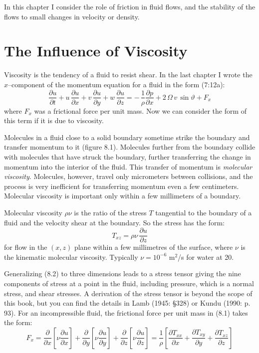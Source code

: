 In this chapter I consider the role of friction in fluid flows, and the stability
of the flows to small changes in velocity or density.

\section{The Influence of Viscosity}
Viscosity is the tendency of a fluid to resist shear. In the last chapter I wrote the $x$--component of the
momentum equation for a fluid in the form (7:12a):
\begin{equation}
\frac{\partial{u}}{\partial{t}}+u\,\frac{\partial{u}}{\partial{x}}+v\,
\frac{\partial{u}}{\partial{y}}+w\,\frac{\partial{u}}{\partial{z}}=-\,
\frac{1}{\rho}\frac{\partial{p}}{\partial{x}} + 2\,\Omega\,v\,\sin\vartheta + F_x
\end{equation}
where $F_x$ was a frictional force per unit mass. Now we can consider the form
of this term if it is due to viscosity.

Molecules in a fluid close to a solid boundary sometime strike the boundary and
transfer momentum to it (figure 8.1). Molecules further from the boundary
collide with molecules that have struck the boundary, further transferring the
change in momentum into the interior of the fluid. This transfer of momentum is
\textit{molecular viscosity}. Molecules, however, travel
only micrometers between collisions, and the process is very inefficient for
transferring momentum even a few centimeters. Molecular viscosity is important only
within a few millimeters of a boundary.

Molecular viscosity $\rho \nu$ is the ratio of the stress $T$ tangential to the
boundary of a fluid and the velocity shear at the boundary. So the
stress has the form:
\begin{equation}
T_{xz} =  \rho \nu \,\frac{\partial{u}}{\partial{z}}
\end{equation}
for flow in the $(x, z)$ plane within a few millimetres of the surface, where $\nu$
is the kinematic molecular viscosity. Typically $\nu = 10^{-6}$ m$^2$/s for water at
20.

Generalizing (8.2) to three dimensions leads to a stress tensor giving
the nine components of stress at a point in the fluid, including
pressure, which is a normal stress, and shear stresses. A derivation of the
stress tensor is beyond the scope of this book, but you can find the details in
Lamb (1945: \S 328) or Kundu (1990: p. 93). For an incompressible fluid, the
frictional force per unit mass in (8.1) takes the form:
\begin{equation}
F_x= \frac{\partial }{\partial x} \left[ \nu \frac{\partial u}{\partial x} \right]
   + \frac{\partial }{\partial y} \left[ \nu \frac{\partial u}{\partial y} \right]
   + \frac{\partial }{\partial z} \left[ \nu \frac{\partial u}{\partial z} \right]
= \frac{1}{\rho} \left[ \frac{\partial T_{xx}}{\partial x} +
                        \frac{\partial T_{xy}}{\partial y} +
                        \frac{\partial T_{xz}}{\partial z} \right]
\end{equation}

